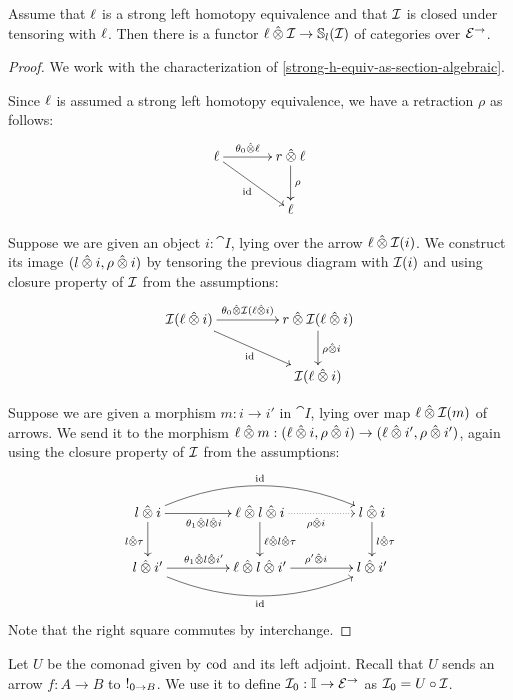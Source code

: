 \documentclass[reqno,10pt,a4paper,oneside]{amsart}
\begin{document}
\begin{lemma}
\label{horn-times-gen-to-she}
Assume that $\intervall$ is a strong left homotopy equivalence and that $\cal{I}$ is closed under tensoring with $\intervall$.
Then there is a functor $\intervall \hatotimes \cal{I} \to \cat{S}_l(\cal{I})$ of categories over $\catE^{\to}$.
\end{lemma}

\begin{proof}
We work with the characterization of \cref{strong-h-equiv-as-section-algebraic}.

Since $\intervall$ is assumed a strong left homotopy equivalence, we have a retraction $\rho$ as follows:
\[
\xymatrix@C+1em{
  \intervall
  \ar[r]^-{\thetal \hatotimes \intervall}
  \ar[dr]_{\id}
&
  \intervalr \hatotimes \intervall \ar[d]^{\rho}
\\&
  \intervall
}
\]

Suppose we are given an object $i : \cat{I}$, lying over the arrow $\intervall \hatotimes \cal{I}(i)$.
We construct its image $(l \hatotimes i, \rho \hatotimes i)$ by tensoring the previous diagram with $\cal{I}(i)$ and using closure property of $\cal{I}$ from the assumptions:
\[
\xymatrix@C+2em{
  \cal{I}(\intervall \hatotimes i)
  \ar[r]^-{\thetal \hatotimes \cal{I}(\intervall \hatotimes i)}
  \ar[dr]_{\id}
&
  \intervalr \hatotimes \cal{I}(\intervall \hatotimes i \ar[d]^{\rho \hatotimes i})
\\&
  \cal{I}(\intervall \hatotimes i)
}
\]

Suppose we are given a morphism $m : i \to i'$ in $\cat{I}$, lying over map $\intervall \hatotimes \cal{I}(m)$ of arrows.
We send it to the morphism $\intervall \hatotimes m : (\intervall \hatotimes i, \rho \hatotimes i) \to (\intervall \hatotimes i', \rho \hatotimes i')$, again using the closure property of $\cal{I}$ from the assumptions: 
\[
\xymatrix@C+2em{
  l \hatotimes i
  \ar[r]_{\thetar \hatotimes l \hatotimes i}
  \ar[d]_{l \hatotimes \tau}
  \ar@/^2em/[rr]^{\id}
&
  \intervall \hatotimes l \hatotimes i
  \ar@{.>}[r]_{\rho \hatotimes i}
  \ar[d]^{\intervall \hatotimes l \hatotimes \tau}
&
  l \hatotimes i
  \ar[d]^{l \hatotimes \tau}
\\
  l \hatotimes i'
  \ar[r]^{\thetar \hatotimes l \hatotimes i'}
  \ar@/_2em/[rr]_{\id}
&
  \intervall \hatotimes l \hatotimes i'
  \ar[r]^{\rho' \hatotimes i}
&
  l \hatotimes i'
}
\]
Note that the right square commutes by interchange.
\end{proof}

Let $U$ be the comonad given by $\cod$ and its left adjoint.
Recall that $U$ sends an arrow $f : A \to B$ to $\canonical_{0 \to B}$.
We use it to define $\cal{I}_0 : \cat{I} \to \catE^{\to}$ as $\cal{I}_0 = U \cc \cal{I}$.
\end{document}
